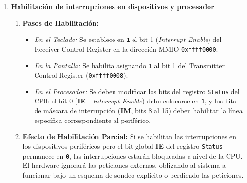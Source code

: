 \documentclass[12pt,letterpaper]{article}
\begin{document}
\begin{enumerate}
\begin{enumerate}[label=\alph*)]
        \item \textbf{Estrategias y Función del EPC:}
        \begin{itemize}
            \item \textit{Redirección de Ejecución:} MIPS32 utiliza un vector de excepciones o una dirección fija de inicio (p. ej., \texttt{0x80000180}). Al detectarse un evento, el hardware fuerza la carga de esta dirección en el \texttt{PC}.
            \item \textit{Función del Registro EPC:} Almacena la dirección exacta de la instrucción interrumpida (o \texttt{PC - 4} en el caso de estar en una ranura de retardo \textit{branch delay slot}). Es indispensable para restaurar la ejecución mediante la instrucción especial \texttt{eret}.
        \end{itemize}
    \end{enumerate}

    \item \textbf{\large\color{UCBlue}Habilitación de interrupciones en dispositivos y procesador}
    
    \vspace{0.2cm}
    \begin{enumerate}[label=\alph*)]
        \item \textbf{Pasos de Habilitación:}
        \begin{itemize}
            \item \textit{En el Teclado:} Se establece en \texttt{1} el bit 1 (\textit{Interrupt Enable}) del Receiver Control Register en la dirección MMIO \texttt{0xffff0000}.
            \item \textit{En la Pantalla:} Se habilita asignando \texttt{1} al bit 1 del Transmitter Control Register (\texttt{0xffff0008}).
            \item \textit{En el Procesador:} Se deben modificar los bits del registro \texttt{Status} del CP0: el bit 0 (\textbf{IE} - \textit{Interrupt Enable}) debe colocarse en \texttt{1}, y los bits de máscara de interrupción (\textbf{IM}, bits 8 al 15) deben habilitar la línea específica correspondiente al periférico.
        \end{itemize}
        
        \item \textbf{Efecto de Habilitación Parcial:}
        Si se habilitan las interrupciones en los dispositivos periféricos pero el bit global \textbf{IE} del registro \texttt{Status} permanece en \texttt{0}, las interrupciones estarán bloqueadas a nivel de la CPU. El hardware ignorará las peticiones externas, obligando al sistema a funcionar bajo un esquema de sondeo explícito o perdiendo las peticiones.
    \end{enumerate}


\end{enumerate}
\end{document}
